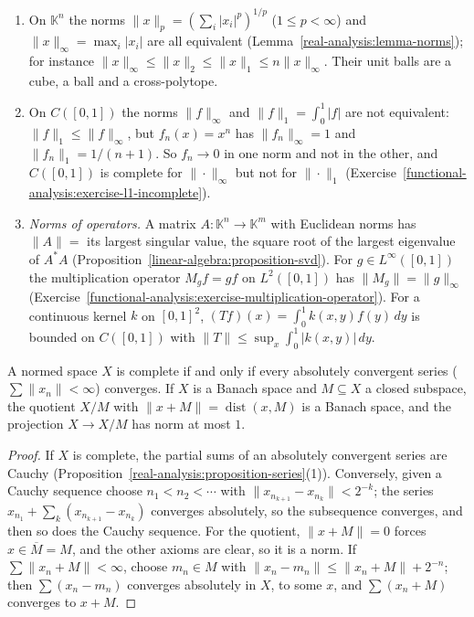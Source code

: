 \begin{example}\label{functional-analysis:example-norms}
\begin{enumerate}
\item On $\mathbb{K}^n$ the norms $\|x\|_p = (\sum_i|x_i|^p)^{1/p}$ ($1 \leq p < \infty$) and $\|x\|_\infty = \max_i|x_i|$ are all equivalent (Lemma~\ref{real-analysis:lemma-norms}); for instance
$\|x\|_\infty \leq \|x\|_2 \leq \|x\|_1 \leq n\|x\|_\infty$. Their unit balls are a cube, a ball and a cross-polytope.
\item On $C([0, 1])$ the norms $\|f\|_\infty$ and $\|f\|_1 = \int_0^1|f|$ are not equivalent: $\|f\|_1 \leq \|f\|_\infty$, but $f_n(x) = x^n$ has $\|f_n\|_\infty = 1$ and $\|f_n\|_1 = 1/(n + 1)$. So
$f_n \to 0$ in one norm and not in the other, and $C([0, 1])$ is complete for $\|\cdot\|_\infty$ but not for $\|\cdot\|_1$ (Exercise~\ref{functional-analysis:exercise-l1-incomplete}).
\item \emph{Norms of operators.} A matrix $A \colon \mathbb{K}^n \to \mathbb{K}^m$ with Euclidean norms has $\|A\| = $ its largest singular value, the square root of the largest eigenvalue of $A^*A$
(Proposition~\ref{linear-algebra:proposition-svd}). For $g \in L^\infty([0, 1])$ the multiplication operator $M_gf = gf$ on $L^2([0, 1])$ has $\|M_g\| = \|g\|_\infty$
(Exercise~\ref{functional-analysis:exercise-multiplication-operator}). For a continuous kernel $k$ on $[0, 1]^2$, $(Tf)(x) = \int_0^1k(x, y)f(y)\,dy$ is bounded on $C([0, 1])$ with
$\|T\| \leq \sup_x\int_0^1|k(x, y)|\,dy$.
\end{enumerate}
\end{example}

\begin{lemma}\label{functional-analysis:lemma-banach-series}
A normed space $X$ is complete if and only if every absolutely convergent series ($\sum\|x_n\| < \infty$) converges. If $X$ is a Banach space and $M \subseteq X$ a closed subspace, the quotient $X/M$ with
$\|x + M\| = \operatorname{dist}(x, M)$ is a Banach space, and the projection $X \to X/M$ has norm at most $1$.
\end{lemma}

\begin{proof}
If $X$ is complete, the partial sums of an absolutely convergent series are Cauchy (Proposition~\ref{real-analysis:proposition-series}(1)). Conversely, given a Cauchy sequence choose $n_1 < n_2 < \cdots$ with
$\|x_{n_{k+1}} - x_{n_k}\| < 2^{-k}$; the series $x_{n_1} + \sum_k(x_{n_{k+1}} - x_{n_k})$ converges absolutely, so the subsequence converges, and then so does the Cauchy sequence. For the quotient,
$\|x + M\| = 0$ forces $x \in \overline{M} = M$, and the other axioms are clear, so it is a norm. If $\sum\|x_n + M\| < \infty$, choose $m_n \in M$ with $\|x_n - m_n\| \leq \|x_n + M\| + 2^{-n}$; then
$\sum(x_n - m_n)$ converges absolutely in $X$, to some $x$, and $\sum(x_n + M)$ converges to $x + M$.
\end{proof}

